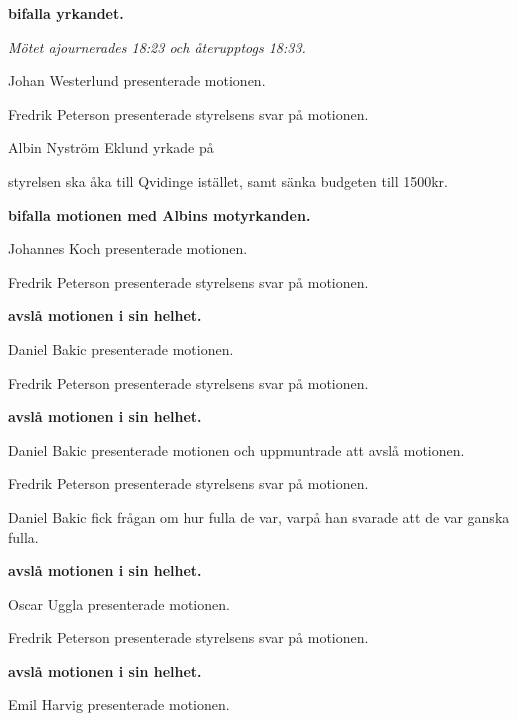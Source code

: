 \documentclass[10pt]{article}
\begin{document}
\begin{paragrafer}
\textbf{\Mba bifalla yrkandet.}

\emph{Mötet ajournerades 18:23 och återupptogs 18:33.}

    \begin{paragrafer}
        Johan Westerlund presenterade motionen.

        Fredrik Peterson presenterade styrelsens svar på motionen.

        Albin Nyström Eklund yrkade på
        \begin{attsatser}
            \att styrelsen ska åka till Qvidinge istället, samt
            \att sänka budgeten till 1500kr.
        \end{attsatser}

        \textbf{\Mba bifalla motionen med Albins motyrkanden.}

        Johannes Koch presenterade motionen.

        Fredrik Peterson presenterade styrelsens svar på motionen.

        \textbf{\Mba avslå motionen i sin helhet.}

        Daniel Bakic presenterade motionen.

        Fredrik Peterson presenterade styrelsens svar på motionen.

        \textbf{\Mba avslå motionen i sin helhet.}

        Daniel Bakic presenterade motionen och uppmuntrade att avslå motionen.

        Fredrik Peterson presenterade styrelsens svar på motionen.

        Daniel Bakic fick frågan om hur fulla de var, varpå han svarade att de var ganska fulla.

        \textbf{\Mba avslå motionen i sin helhet.}

        Oscar Uggla presenterade motionen.

        Fredrik Peterson presenterade styrelsens svar på motionen.

        \textbf{\Mba avslå motionen i sin helhet.}

        Emil Harvig presenterade motionen.


\end{paragrafer}
\end{paragrafer}
\end{document}
